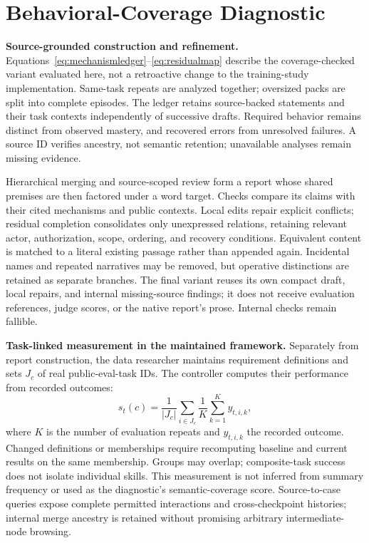\section{Behavioral-Coverage Diagnostic}
\label{app:analysiscoverage}

\textbf{Source-grounded construction and refinement.}\quad
\label{app:analysisconstruction}
Equations~\ref{eq:mechanismledger}--\ref{eq:residualmap} describe the
coverage-checked variant evaluated here, not a retroactive change to the
training-study implementation. Same-task repeats are analyzed together;
oversized packs are split into complete episodes. The ledger retains
source-backed statements and their task contexts independently of successive
drafts. Required behavior remains distinct from observed mastery, and recovered
errors from unresolved failures. A source ID verifies ancestry, not semantic
retention; unavailable analyses remain missing evidence.

Hierarchical merging and source-scoped review form a report whose shared
premises are then factored under a word target. Checks compare its claims with
their cited mechanisms and public contexts. Local edits repair explicit
conflicts; residual completion consolidates only unexpressed relations,
retaining relevant actor, authorization, scope, ordering, and recovery
conditions. Equivalent content is matched to a literal existing passage
rather than appended again. Incidental names and repeated narratives may be
removed, but operative distinctions are retained as separate branches.
The final variant reuses its own compact draft, local repairs, and
internal missing-source findings; it does not receive evaluation references,
judge scores, or the native report's prose. Internal checks remain fallible.

\textbf{Task-linked measurement in the maintained framework.}\quad
Separately from report construction, the data researcher maintains requirement
definitions and sets $J_c$ of real public-eval-task IDs. The controller computes
their performance from recorded outcomes:
\begin{equation}
s_t(c)=\frac{1}{|J_c|}\sum_{i\in J_c}
       \frac{1}{K}\sum_{k=1}^{K}y_{t,i,k},
\label{eq:capability}
\end{equation}
where $K$ is the number of evaluation repeats and $y_{t,i,k}$ the recorded
outcome. Changed definitions or memberships require recomputing baseline and
current results on the same membership. Groups may overlap; composite-task
success does not isolate individual skills. This measurement is not inferred
from summary frequency or used as the diagnostic's semantic-coverage score.
Source-to-case queries expose complete permitted interactions and
cross-checkpoint histories; internal merge ancestry is retained without
promising arbitrary intermediate-node browsing.

